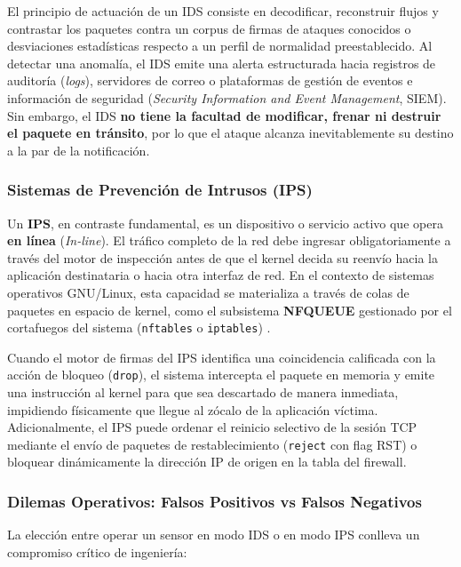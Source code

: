 El principio de actuación de un IDS consiste en decodificar, reconstruir flujos y contrastar los paquetes contra un corpus de firmas de ataques conocidos o desviaciones estadísticas respecto a un perfil de normalidad preestablecido. Al detectar una anomalía, el IDS emite una alerta estructurada hacia registros de auditoría (\textit{logs}), servidores de correo o plataformas de gestión de eventos e información de seguridad (\textit{Security Information and Event Management}, SIEM). Sin embargo, el IDS \textbf{no tiene la facultad de modificar, frenar ni destruir el paquete en tránsito}, por lo que el ataque alcanza inevitablemente su destino a la par de la notificación.

\subsubsection{Sistemas de Prevención de Intrusos (IPS)}
Un \textbf{IPS}, en contraste fundamental, es un dispositivo o servicio activo que opera \textbf{en línea} (\textit{In-line}). El tráfico completo de la red debe ingresar obligatoriamente a través del motor de inspección antes de que el kernel decida su reenvío hacia la aplicación destinataria o hacia otra interfaz de red. En el contexto de sistemas operativos GNU/Linux, esta capacidad se materializa a través de colas de paquetes en espacio de kernel, como el subsistema \textbf{NFQUEUE} gestionado por el cortafuegos del sistema (\texttt{nftables} o \texttt{iptables}) \citep{netfilter_nfqueue_2023}.

Cuando el motor de firmas del IPS identifica una coincidencia calificada con la acción de bloqueo (\texttt{drop}), el sistema intercepta el paquete en memoria y emite una instrucción al kernel para que sea descartado de manera inmediata, impidiendo físicamente que llegue al zócalo de la aplicación víctima. Adicionalmente, el IPS puede ordenar el reinicio selectivo de la sesión TCP mediante el envío de paquetes de restablecimiento (\texttt{reject} con flag RST) o bloquear dinámicamente la dirección IP de origen en la tabla del firewall.

\subsubsection{Dilemas Operativos: Falsos Positivos vs Falsos Negativos}
La elección entre operar un sensor en modo IDS o en modo IPS conlleva un compromiso crítico de ingeniería:

